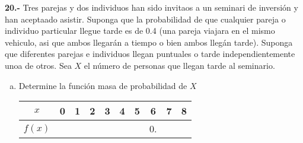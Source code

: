 \documentclass[12pt, letterpaper, spanish]{article}
\begin{document}
\textbf{20.-} Tres parejas y dos individuos  han sido invitaos a un seminari de inversión y han aceptaado asistir. Suponga que la probabilidad de que cualquier pareja o individuo particular llegue tarde es de 0.4 (una pareja viajara en el mismo vehiculo, asi que ambos llegarán a tiempo o bien ambos llegán tarde). Suponga que diferentes parejas e individuos llegan puntuales o tarde independientemente unoa de otros. Sea $X$ el número de personas que llegan tarde al seminario.\\
\begin{enumerate}[a)]
	\item Determine la función masa de probabilidad de $X$\\
	\begin{tabular}{|c|c|c|c|c|c|c|c|c|c|}
		\hline
		$x$ & 0 & 1 & 2 & 3 & 4 & 5 & 6 & 7 & 8  \\ \hline
		$f(x)$ &  &  &  &  &  &  & 0. & \\ \hline
	\end{tabular}
\end{enumerate}
\end{document}
